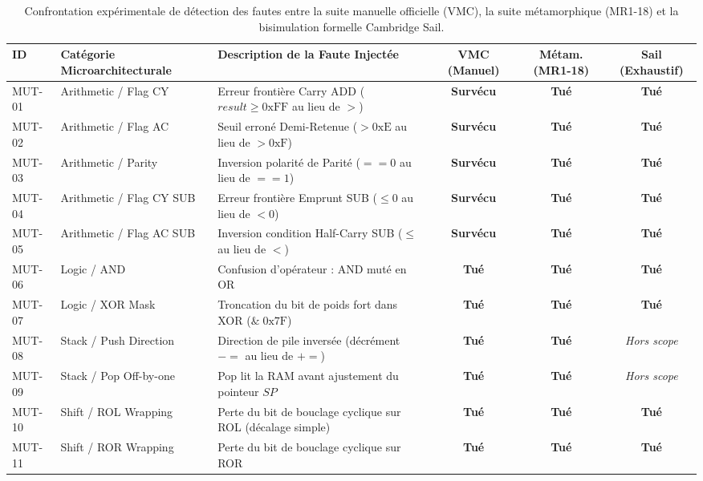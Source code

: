 \documentclass[10pt,journal,compsoc]{IEEEtran}
\begin{document}
\begin{table}[t]
\centering
\caption{Confrontation expérimentale de détection des fautes entre la suite manuelle officielle (VMC), la suite métamorphique (MR1-18) et la bisimulation formelle Cambridge Sail.}
\label{tab:mutation_results}
\scriptsize
\setlength{\tabcolsep}{4.5pt}
\begin{tabularx}{\textwidth}{l p{3.8cm} X ccc}
\toprule
\textbf{ID} & \textbf{Catégorie Microarchitecturale} & \textbf{Description de la Faute Injectée} & \textbf{VMC (Manuel)} & \textbf{Métam. (MR1-18)} & \textbf{Sail (Exhaustif)} \\
\midrule
MUT-01 & Arithmetic / Flag CY & Erreur frontière Carry ADD ($result \ge 0\text{xFF}$ au lieu de $>$) & \textbf{Survécu} & \textbf{Tué} & \textbf{Tué} \\
MUT-02 & Arithmetic / Flag AC & Seuil erroné Demi-Retenue ($> 0\text{xE}$ au lieu de $> 0\text{xF}$) & \textbf{Survécu} & \textbf{Tué} & \textbf{Tué} \\
MUT-03 & Arithmetic / Parity & Inversion polarité de Parité ($== 0$ au lieu de $== 1$) & \textbf{Survécu} & \textbf{Tué} & \textbf{Tué} \\
MUT-04 & Arithmetic / Flag CY SUB & Erreur frontière Emprunt SUB ($\le 0$ au lieu de $< 0$) & \textbf{Survécu} & \textbf{Tué} & \textbf{Tué} \\
MUT-05 & Arithmetic / Flag AC SUB & Inversion condition Half-Carry SUB ($\le$ au lieu de $<$) & \textbf{Survécu} & \textbf{Tué} & \textbf{Tué} \\
MUT-06 & Logic / AND & Confusion d'opérateur : AND muté en OR & \textbf{Tué} & \textbf{Tué} & \textbf{Tué} \\
MUT-07 & Logic / XOR Mask & Troncation du bit de poids fort dans XOR ($\& \; 0\text{x7F}$) & \textbf{Tué} & \textbf{Tué} & \textbf{Tué} \\
MUT-08 & Stack / Push Direction & Direction de pile inversée (décrément $-=$ au lieu de $+=$) & \textbf{Tué} & \textbf{Tué} & \textit{Hors scope} \\
MUT-09 & Stack / Pop Off-by-one & Pop lit la RAM avant ajustement du pointeur $SP$ & \textbf{Tué} & \textbf{Tué} & \textit{Hors scope} \\
MUT-10 & Shift / ROL Wrapping & Perte du bit de bouclage cyclique sur ROL (décalage simple) & \textbf{Tué} & \textbf{Tué} & \textbf{Tué} \\
MUT-11 & Shift / ROR Wrapping & Perte du bit de bouclage cyclique sur ROR & \textbf{Tué} & \textbf{Tué} & \textbf{Tué} \\

\end{tabularx}
\end{table}
\end{document}
